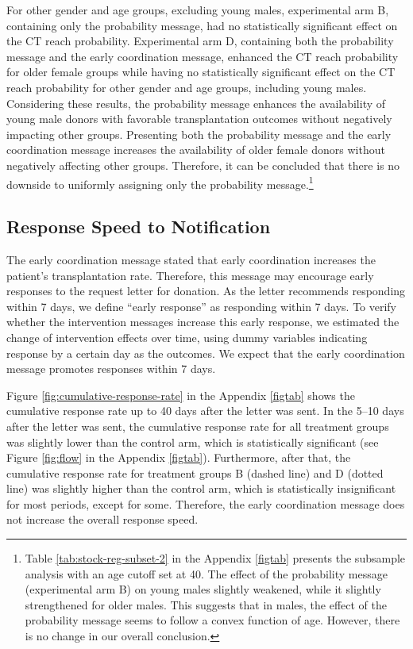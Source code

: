 \documentclass[12pt, a4paper]{article}
\begin{document}
For other gender and age groups, excluding young males, experimental arm B, containing only the probability message, had no statistically significant effect on the CT reach probability. Experimental arm D, containing both the probability message and the early coordination message, enhanced the CT reach probability for older female groups while having no statistically significant effect on the CT reach probability for other gender and age groups, including young males. Considering these results, the probability message enhances the availability of young male donors with favorable transplantation outcomes without negatively impacting other groups. Presenting both the probability message and the early coordination message increases the availability of older female donors without negatively affecting other groups. Therefore, it can be concluded that there is no downside to uniformly assigning only the probability message.\footnote{Table \ref{tab:stock-reg-subset-2} in the Appendix \ref{figtab} presents the subsample analysis with an age cutoff set at 40. The effect of the probability message (experimental arm B) on young males slightly weakened, while it slightly strengthened for older males. This suggests that in males, the effect of the probability message seems to follow a convex function of age. However, there is no change in our overall conclusion.}

\hypertarget{reply-speed}{%
\subsection{Response Speed to Notification}\label{reply-speed}}

The early coordination message stated that early coordination increases the patient's transplantation rate. Therefore, this message may encourage early responses to the request letter for donation. As the letter recommends responding within 7 days, we define ``early response'' as responding within 7 days. To verify whether the intervention messages increase this early response, we estimated the change of intervention effects over time, using dummy variables indicating response by a certain day as the outcomes. We expect that the early coordination message promotes responses within 7 days.

Figure \ref{fig:cumulative-response-rate} in the Appendix \ref{figtab} shows the cumulative response rate up to 40 days after the letter was sent. In the 5--10 days after the letter was sent, the cumulative response rate for all treatment groups was slightly lower than the control arm, which is statistically significant (see Figure \ref{fig:flow} in the Appendix \ref{figtab}). Furthermore, after that, the cumulative response rate for treatment groups B (dashed line) and D (dotted line) was slightly higher than the control arm, which is statistically insignificant for most periods, except for some. Therefore, the early coordination message does not increase the overall response speed.
\end{document}
